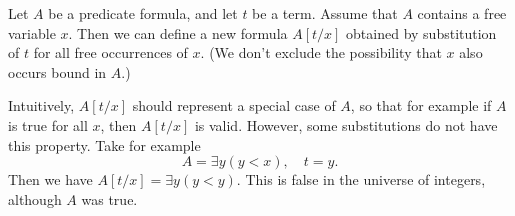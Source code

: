 

\setcounter{section}{2}
\setcounter{subsection}{1}
\setcounter{dfn}{0}

Let $A$ be a predicate formula, and let $t$ be a term.
Assume that $A$ contains a free variable $x$.
Then we can define a new formula $A[t/x]$ obtained by substitution of $t$ for all free occurrences of $x$.
(We don't exclude the possibility that $x$ also occurs bound in $A$.)

Intuitively, $A[t/x]$ should represent a special case of $A$, so that for example if $A$ is true for all $x$, then $A[t/x]$ is valid.
However, some substitutions do not have this property.
Take for example
\[
A = \exists y (y < x), \quad t = y.
\]
Then we have $A[t/x] = \exists y (y < y)$.
This is false in the universe of integers, although $A$ was true.



